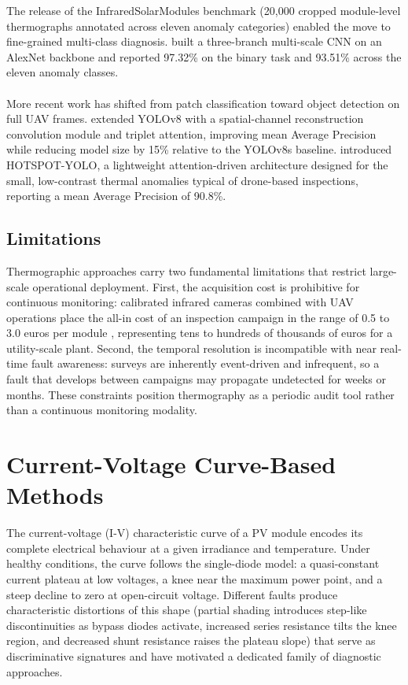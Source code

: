 The release of the InfraredSolarModules benchmark (20{,}000 cropped module-level thermographs annotated across eleven anomaly categories) enabled the move to fine-grained multi-class diagnosis. \citet{korkmaz2022multiscale} built a three-branch multi-scale CNN on an AlexNet backbone and reported 97.32\% on the binary task and 93.51\% across the eleven anomaly classes.

\paragraph{}
More recent work has shifted from patch classification toward object detection on full UAV frames. \citet{xie2024styolo} extended YOLOv8 with a spatial-channel reconstruction convolution module and triplet attention, improving mean Average Precision while reducing model size by 15\% relative to the YOLOv8s baseline. \citet{dhimish2025hotspot} introduced HOTSPOT-YOLO, a lightweight attention-driven architecture designed for the small, low-contrast thermal anomalies typical of drone-based inspections, reporting a mean Average Precision of 90.8\%.

\subsection{Limitations}
Thermographic approaches carry two fundamental limitations that restrict large-scale operational deployment. First, the acquisition cost is prohibitive for continuous monitoring: calibrated infrared cameras combined with UAV operations place the all-in cost of an inspection campaign in the range of 0.5 to 3.0 euros per module \citep{herz2021}, representing tens to hundreds of thousands of euros for a utility-scale plant. Second, the temporal resolution is incompatible with near real-time fault awareness: surveys are inherently event-driven and infrequent, so a fault that develops between campaigns may propagate undetected for weeks or months. These constraints position thermography as a periodic audit tool rather than a continuous monitoring modality.

\section{Current-Voltage Curve-Based Methods}
\label{sec:ivcurve}

The current-voltage (I-V) characteristic curve of a PV module encodes its complete electrical behaviour at a given irradiance and temperature. Under healthy conditions, the curve follows the single-diode model: a quasi-constant current plateau at low voltages, a knee near the maximum power point, and a steep decline to zero at open-circuit voltage. Different faults produce characteristic distortions of this shape (partial shading introduces step-like discontinuities as bypass diodes activate, increased series resistance tilts the knee region, and decreased shunt resistance raises the plateau slope) that serve as discriminative signatures and have motivated a dedicated family of diagnostic approaches.

